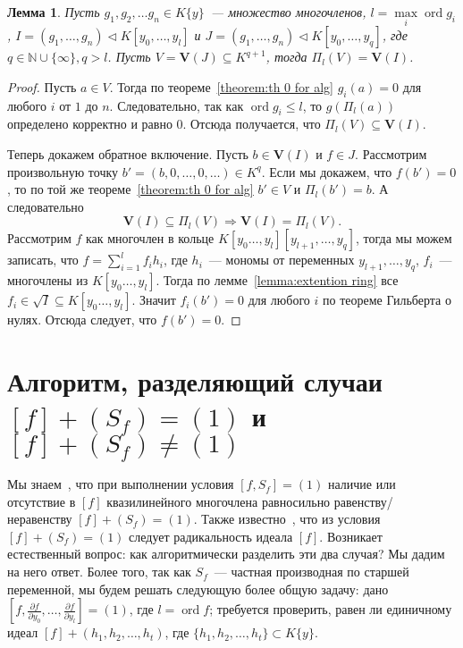\documentclass[16pt]{article}
\DeclareMathOperator{\ord}{ord}
\renewcommand{\le}{\leqslant} %
\theoremstyle{plain1}
\newtheorem{lemma}[theorem1]{Лемма}
\theoremstyle{plain2}
\theoremstyle{plain}
\theoremstyle{plain3}
\theoremstyle{definition}
\theoremstyle{remark}
\begin{document}
\begin{lemma} \label{lemma:o proekcii}
Пусть $g_1,g_2,\ldots g_n\in K\{y\}$~--- множество многочленов,
$l=\max\limits_i\ord g_i$,
$I =(g_1,\ldots,g_n) \triangleleft K[y_0,\ldots,y_l]$ и $J =(g_1,\ldots,g_n) \triangleleft K[y_0,\ldots,y_q]$, где
$q\in \mathbb{N}\cup\{\infty\},q> l$. Пусть
$V=\mathbf{V}(J)\subseteq K^{q+1}$,
тогда $\Pi_l(V)=\mathbf{V}(I)$.
\end{lemma}

\begin{proof}

Пусть $a\in V$.
Тогда по теореме~\ref{theorem:th 0 for alg} $g_i(a)=0$ для любого $i$ от $1$ до $n$. Следовательно, так как $\ord g_i \le l$, то $g(\Pi_l(a))$ определено корректно и равно 0. Отсюда получается, что $\Pi_l(V)\subseteq\mathbf{V} (I)$.


Теперь  докажем обратное включение. Пусть $b\in \mathbf{V} (I)$  и $f\in J$. 
Рассмотрим произвольную точку $b'=(b,0,\ldots,0,\ldots)\in K^{q}$. Если мы докажем, что $f(b')=0$, то по той же теореме~\ref{theorem:th 0 for alg}  $b'\in V$ и $\Pi_l(b')=b$. А следовательно $$ \mathbf{V}(I)\subseteq\Pi_l(V)\Rightarrow \mathbf{V}(I)=\Pi_l(V).$$
Рассмотрим $f$  как многочлен в кольце $K[y_0\ldots,y_l][y_{l+1},\ldots,y_q]$, тогда мы можем записать, что $f=\sum\limits_{i=1}^lf_ih_i$, где $h_i$~--- мономы от переменных $y_{l+1},\ldots,y_q$, $f_i$~--- многочлены из $K[y_0\ldots,y_l]$. Тогда по лемме~\ref{lemma:extention ring} все $f_i\in \sqrt{I}\subseteq K[y_0\ldots,y_l]$. Значит $f_i(b')=0$ для любого $i$ по теореме Гильберта о нулях. Отсюда следует, что $f(b')=0$.

\end{proof}


\section{Алгоритм, разделяющий случаи $[f]+(S_f)=(1)$ и $[f]+(S_f)\neq(1)$}

Мы знаем~\cite{Trushin}, что при выполнении условия $[f,S_f]=(1)$ наличие или отсутствие в $[f]$ квазилинейного многочлена равносильно равенству/неравенству $[f]+(S_f)=(1)$.
Также известно~\cite{E. R. Kolchin}, что из условия $[f]+(S_f)=(1)$ следует радикальность идеала $[f]$.
Возникает естественный вопрос: как алгоритмически разделить эти два случая?
Мы дадим на него ответ. Более того, так как $S_f$~--- частная производная по старшей переменной, мы будем решать следующую более общую задачу: дано $[f,\frac{\partial f}{\partial y_0},\ldots, \frac{\partial f}{\partial y_l}]=(1)$, где $l=\ord f$; требуется проверить, равен ли единичному идеал $[f]+(h_1,h_2,\ldots,h_t)$, где $\{h_1,h_2,\ldots,h_t\}\subset K\{y\}$.
\end{document}
